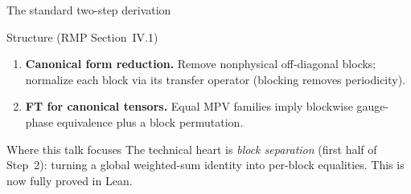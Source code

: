\documentclass[aspectratio=169,10pt]{beamer}
\begin{document}
\begin{frame}{The standard two-step derivation~\cite{Cirac2021Matrix}}
    \vspace{-0.6em}

    \begin{block}{Structure (RMP Section~IV.1)}
        \begin{enumerate}\itemsep0.2em
            \item \textbf{Canonical form reduction.}
                  Remove nonphysical off-diagonal blocks; normalize each block
                  via its transfer operator (blocking removes periodicity).
            \item \textbf{FT for canonical tensors.}
                  Equal MPV families imply blockwise gauge-phase equivalence
                  plus a block permutation.
        \end{enumerate}
    \end{block}

    \begin{block}{Where this talk focuses}
        The technical heart is \emph{block separation} (first half of Step~2):
        turning a global weighted-sum identity into per-block equalities.
        \textcolor{leangreen}{This is now fully proved in Lean.}
    \end{block}
\end{frame}
\end{document}
